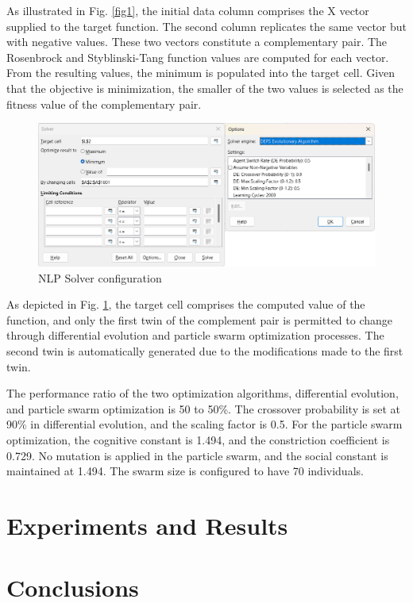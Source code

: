 \documentclass[runningheads]{llncs}
\begin{document}
As illustrated in Fig. \ref{fig1}, the initial data column comprises the X vector supplied to the target function. The second column replicates the same vector but with negative values. These two vectors constitute a complementary pair. The Rosenbrock and Styblinski-Tang function values are computed for each vector. From the resulting values, the minimum is populated into the target cell. Given that the objective is minimization, the smaller of the two values is selected as the fitness value of the complementary pair.

\begin{figure}
\includegraphics[width=\textwidth]{fig2.png}
\caption{NLP Solver configuration} \label{fig2}
\end{figure}

As depicted in Fig. \ref{fig2}, the target cell comprises the computed value of the function, and only the first twin of the complement pair is permitted to change through differential evolution and particle swarm optimization processes. The second twin is automatically generated due to the modifications made to the first twin.

The performance ratio of the two optimization algorithms, differential evolution, and particle swarm optimization is 50 to 50\%. The crossover probability is set at 90\% in differential evolution, and the scaling factor is 0.5. For the particle swarm optimization, the cognitive constant is 1.494, and the constriction coefficient is 0.729. No mutation is applied in the particle swarm, and the social constant is maintained at 1.494. The swarm size is configured to have 70 individuals.

\section{Experiments and Results}

\section{Conclusions}
\end{document}
